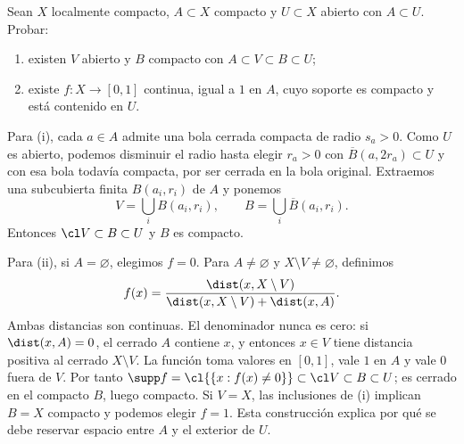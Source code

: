 \begin{ejercicio}
Sean $X$ localmente compacto, $A\subset X$ compacto y $U\subset X$ abierto con $A\subset U$. Probar:
\begin{enumerate}[label=(\roman*)]
\item existen $V$ abierto y $B$ compacto con $A\subset V\subset B\subset U$;
\item existe $f:X\to[0,1]$ continua, igual a $1$ en $A$, cuyo soporte es compacto y está contenido en $U$.
\end{enumerate}
\end{ejercicio}
\begin{solucion}
Para (i), cada $a\in A$ admite una bola cerrada compacta de radio $s_a>0$. Como $U$ es abierto, podemos disminuir el radio hasta elegir $r_a>0$ con $\overline B(a,2r_a)\subset U$ y con esa bola todavía compacta, por ser cerrada en la bola original. Extraemos una subcubierta finita $B(a_i,r_i)$ de $A$ y ponemos
\[
V=\bigcup_iB(a_i,r_i),\qquad B=\bigcup_i\overline B(a_i,r_i).
\]
Entonces $\cl V\subset B\subset U$ y $B$ es compacto.

Para (ii), si $A=\varnothing$, elegimos $f=0$. Para $A\ne\varnothing$ y $X\setminus V\ne\varnothing$, definimos
\[
f(x)=\frac{\dist(x,X\setminus V)}{\dist(x,X\setminus V)+\dist(x,A)}.
\]
Ambas distancias son continuas. El denominador nunca es cero: si $\dist(x,A)=0$, el cerrado $A$ contiene $x$, y entonces $x\in V$ tiene distancia positiva al cerrado $X\setminus V$. La función toma valores en $[0,1]$, vale $1$ en $A$ y vale $0$ fuera de $V$. Por tanto $\supp f=\cl{\{x:f(x)\ne0\}}\subset\cl V\subset B\subset U$; es cerrado en el compacto $B$, luego compacto. Si $V=X$, las inclusiones de (i) implican $B=X$ compacto y podemos elegir $f=1$. Esta construcción explica por qué se debe reservar espacio entre $A$ y el exterior de $U$.
\end{solucion}

